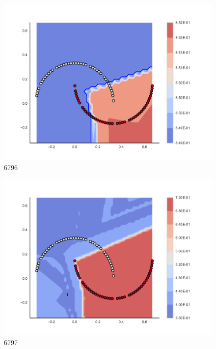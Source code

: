 \begin{subfigure}[b]{0.09\textwidth}
    \includegraphics[clip, trim=2.35cm 1.75cm 4.5cm 0cm,width=\textwidth]{img/convergence/6796.pdf}
    \caption{6796}
    \label{fig:convergence_6796}
\end{subfigure}
%
\begin{subfigure}[b]{0.09\textwidth}
    \includegraphics[clip, trim=2.35cm 1.75cm 4.5cm 0cm,width=\textwidth]{img/convergence/6797.pdf}
    \caption{6797}
    \label{fig:convergence_6797}
\end{subfigure}
%
